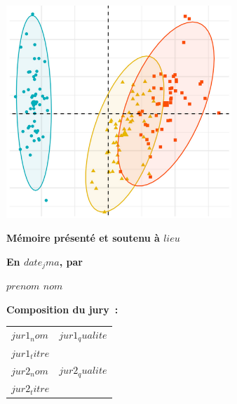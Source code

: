 \documentclass[12pt,a4paper]{reedthesis}
\begin{document}
\begin{titlepage}
\vspace{10mm}

\begin{center}
\includegraphics[height=8cm]{logos/accueil.png}
\end{center}

\vspace{10mm}

\textbf{Mémoire présenté et soutenu à $lieu$}

\medskip

\textbf{En $date_jma$, par}

\bigskip
\bigskip

\Large {\color{Prune} \textbf{$prenom$ $nom$}}

\vspace{15mm}

\flushleft \normalsize \textbf{Composition du jury~:}
\bigskip

\scriptsize
{}
\begin{tabular}{|p{4cm}l}
\textbf{$jur1_nom$} &  $jur1_qualite$\\
$jur1_titre$ & \\
\textbf{$jur2_nom$} &  $jur2_qualite$\\
$jur2_titre$ & \\
\end{tabular}


\end{titlepage}
\end{document}
